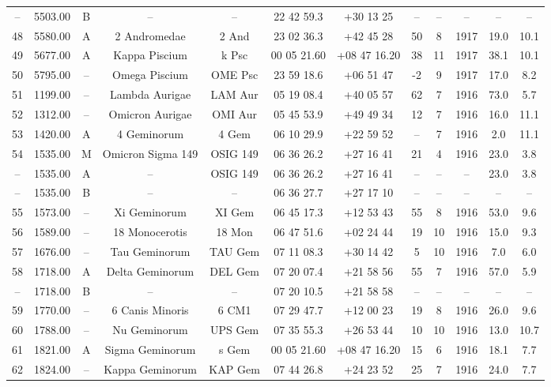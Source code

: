 \begin{table}
\begin{tabular}{cccccccccccc}
-- & 5503.00 & B & -- & -- & 22 42 59.3 & +30 13 25 & -- & -- & -- & -- & -- \\
48 & 5580.00 & A & 2 Andromedae & 2 And & 23 02 36.3 & +42 45 28 & 50 & 8 & 1917 & 19.0 & 10.1 \\
49 & 5677.00 & A & Kappa Piscium & k Psc & 00 05 21.60 & +08 47 16.20 & 38 & 11 & 1917 & 38.1 & 10.1 \\
50 & 5795.00 & -- & Omega Piscium & OME Psc & 23 59 18.6 & +06 51 47 & -2 & 9 & 1917 & 17.0 & 8.2 \\
51 & 1199.00 & -- & Lambda Aurigae & LAM Aur & 05 19 08.4 & +40 05 57 & 62 & 7 & 1916 & 73.0 & 5.7 \\
52 & 1312.00 & -- & Omicron Aurigae & OMI Aur & 05 45 53.9 & +49 49 34 & 12 & 7 & 1916 & 16.0 & 11.1 \\
53 & 1420.00 & A & 4 Geminorum & 4 Gem & 06 10 29.9 & +22 59 52 & -- & 7 & 1916 & 2.0 & 11.1 \\
54 & 1535.00 & M & Omicron Sigma 149 & OSIG  149 & 06 36 26.2 & +27 16 41 & 21 & 4 & 1916 & 23.0 & 3.8 \\
-- & 1535.00 & A & -- & OSIG  149 & 06 36 26.2 & +27 16 41 & -- & -- & -- & 23.0 & 3.8 \\
-- & 1535.00 & B & -- & -- & 06 36 27.7 & +27 17 10 & -- & -- & -- & -- & -- \\
55 & 1573.00 & -- & Xi Geminorum & XI Gem & 06 45 17.3 & +12 53 43 & 55 & 8 & 1916 & 53.0 & 9.6 \\
56 & 1589.00 & -- & 18 Monocerotis & 18 Mon & 06 47 51.6 & +02 24 44 & 19 & 10 & 1916 & 15.0 & 9.3 \\
57 & 1676.00 & -- & Tau Geminorum & TAU Gem & 07 11 08.3 & +30 14 42 & 5 & 10 & 1916 & 7.0 & 6.0 \\
58 & 1718.00 & A & Delta Geminorum & DEL Gem & 07 20 07.4 & +21 58 56 & 55 & 7 & 1916 & 57.0 & 5.9 \\
-- & 1718.00 & B & -- & -- & 07 20 10.5 & +21 58 58 & -- & -- & -- & -- & -- \\
59 & 1770.00 & -- & 6 Canis Minoris & 6 CM1 & 07 29 47.7 & +12 00 23 & 19 & 8 & 1916 & 26.0 & 9.6 \\
60 & 1788.00 & -- & Nu Geminorum & UPS Gem & 07 35 55.3 & +26 53 44 & 10 & 10 & 1916 & 13.0 & 10.7 \\
61 & 1821.00 & A & Sigma Geminorum & s Gem & 00 05 21.60 & +08 47 16.20 & 15 & 6 & 1916 & 18.1 & 7.7 \\
62 & 1824.00 & -- & Kappa Geminorum & KAP Gem & 07 44 26.8 & +24 23 52 & 25 & 7 & 1916 & 24.0 & 7.7 \\

\end{tabular}
\end{table}

